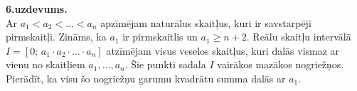 \documentclass[a4paper]{article}
\begin{document}
\vspace{10pt}
{\bf 6.uzdevums.}\\
Ar $a_1 < a_2 < ... < a_n$ apzīmējam naturālus skaitļus, kuri ir savstarpēji pirmskaitļi. 
Zināms, ka $a_1$ ir pirmskaitlis un $a_1 \geq n+2$. 
Reālu skaitļu intervālā $I = \left[0;\,a_1\cdot{}a_2\cdot\ldots\cdot a_n\right]$ 
atzīmējam visus veselos skaitļus, kuri dalās vismaz ar vienu no skaitļiem 
$a_1,\ldots,a_n$. Šie punkti sadala $I$ vairākos mazākos nogriežņos. 
Pierādīt, ka visu šo nogriežņu garumu kvadrātu summa dalās ar $a_1$. 
\end{document}
